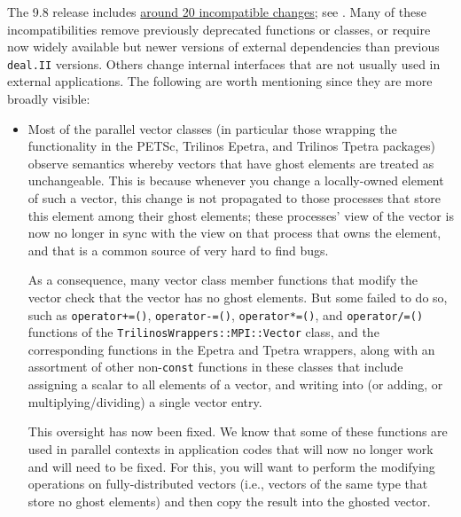 \documentclass{ansarticle-preprint}
\newcommand{\specialword}[1]{\texttt{#1}}
\newcommand{\dealii}{{\specialword{deal.II}}\xspace}
\begin{document}
The 9.8 release includes
\href{https://dealii.org/developer/doxygen/deal.II/changes_between_9_7_1_and_9_8_0.html}
     {around 20 incompatible changes};
see \cite{changes98}. Many of these
incompatibilities remove previously deprecated functions or classes,
or require now widely available but newer versions of external
dependencies than previous \dealii{} versions. Others
change internal
interfaces that are not usually used in external
applications. The following are worth mentioning since they
are more broadly visible:
\begin{itemize}
\item  Most of the parallel vector classes (in particular those
  wrapping the functionality in the PETSc, Trilinos Epetra, and
  Trilinos Tpetra packages) observe semantics whereby vectors that
  have ghost elements are treated as unchangeable. This is
  because whenever you change a locally-owned element of such a
  vector, this change is not propagated to those processes that store
  this element among their ghost elements; these processes' view of the vector is now no longer in sync with the view on that process that owns the element, and that is a common source of very hard to find bugs.

  As a consequence, many vector class member functions that
  modify the vector check that the vector has no ghost elements. But
  some failed to do so, such as \texttt{operator+=()},
  \texttt{operator-=()}, \texttt{operator*=()}, and
  \texttt{operator/=()} functions of the
  \texttt{TrilinosWrappers::\allowbreak{}MPI::\allowbreak{}Vector} class, and the corresponding functions in the Epetra and Tpetra wrappers, along with an assortment of other non-\texttt{const} functions in these classes that include assigning a scalar to all elements of a vector, and writing into (or adding, or multiplying/dividing) a single vector entry.

This oversight has now been fixed. We know that some of these
functions are used in parallel contexts in application codes that will
now no longer work and will need to be fixed. For this, you will want
to perform the modifying operations on fully-distributed vectors (i.e.,
vectors of the same type that store no ghost elements) and then copy
the result into the ghosted vector.


\end{itemize}
\end{document}
